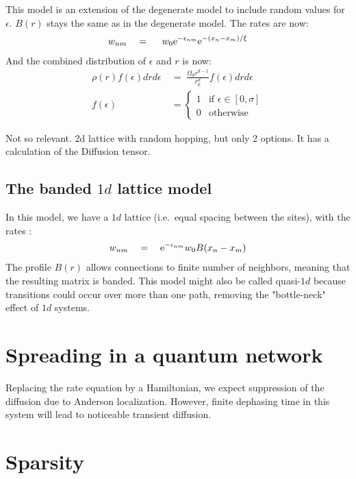 This model is an extension of the degenerate model to include
random values for $\epsilon$. $B(r)$ stays the same as in the degenerate model.
The rates are now:
%
\begin{align}\label{eq:mott_hopping_rates}
w_{nm} \quad = \quad \ w_0 \mbox{e}^{-\epsilon_{nm}}\mbox{e}^{-(x_n-x_m)/\xi}
\end{align}
%
And the combined distribution of $\epsilon$ and $r$ is now:
%
\begin{align}\label{eq:mott_distribution}
\rho(r)f(\epsilon)drd\epsilon \ &=\ \frac{\Omega_d r^{d-1}}{r_0^d} f(\epsilon) dr d\epsilon \\
f(\epsilon)\ &= 
  \begin{cases} 
    1 &\textrm{if   } \epsilon \in [0,\sigma] \\
    0 &\textrm{otherwise}
  \end{cases}
\end{align}
%

Not so relevant. 2d lattice with random hopping, but only 2 options. It has a calculation of the Diffusion tensor.
\subsection{The banded $1d$ lattice model}\label{sec:banded}

In this model, we have a $1d$ lattice (i.e.\ equal spacing between the sites), 
with the rates :
%
\begin{align}
w_{nm} \quad = \quad \mbox{e}^{-\epsilon_{nm}}w_0 B(x_n-x_m)
\end{align}
%
The profile $B(r)$ allows connections to finite number of neighbors,
meaning that the resulting matrix is banded. This model might also
be called quasi-$1d$ because transitions could occur over more
than one path, removing the "bottle-neck" effect of $1d$ systems.


\section{Spreading in a quantum network}

Replacing the rate equation by a Hamiltonian, 
we expect suppression of the diffusion due to Anderson localization. However, finite
dephasing time in this system will lead to noticeable transient diffusion.

\section{Sparsity}\label{sec:sparsity}

